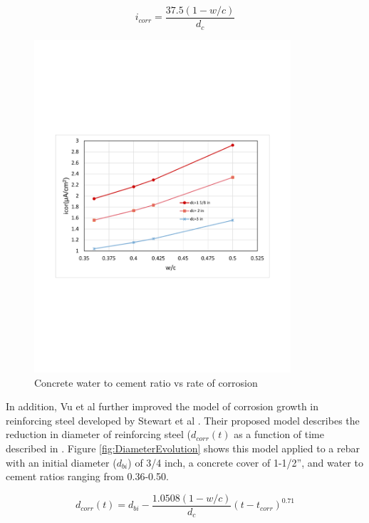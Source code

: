 \begin{equation}
  i_{corr}=\frac{37.5(1-w/c)}{d_c}
  \label{eq.CorrosionRate}
\end{equation} 

\begin{figure}[htbp]
\centering
\includegraphics[width=0.85\textwidth]{Chapter-2/figs/wc_icor}
\caption{Concrete water to cement ratio vs rate of corrosion}
\label{fig:hist1}
\end{figure}

In addition, Vu et al  further improved the model of corrosion growth in reinforcing steel developed by Stewart et al \cite{Vu2000}\cite{Stewart1998}\cite{Choe2008}\cite{Ghosh2010}. Their proposed model describes the reduction in diameter of reinforcing steel ($d_{corr}(t)$ as a function of time described in . Figure \ref{fig:DiameterEvolution} shows this model applied to a rebar with an initial diameter ($d_{bi}$) of 3/4 inch, a concrete cover of 1-1/2”, and water to cement ratios ranging from 0.36-0.50.

\begin{equation}
  d_{corr}(t)=d_{bi}-\frac{1.0508(1-w/c)}{d_c} (t-t_{corr})^{0.71}
  \label{eq.CorrosionEvolution}
\end{equation} 

